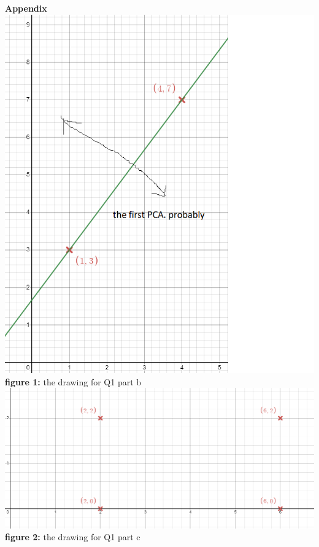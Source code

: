 \documentclass{article}
\theoremstyle{definition}
\theoremstyle{remark}
\begin{document}
       \begin{enumerate}[font={\Large\bfseries},left=0pt]
	            
    
    	             
	  
	            
       
                
	 
 
    \end{enumerate}
    
    \textbf{Appendix}
     \includegraphics[scale=0.5]{figs/pca1.png}\\
     \textbf{figure 1:} the drawing for Q1 part b\\
     
     \includegraphics[scale=0.5]{figs/pca2.png}\\
     \textbf{figure 2:} the drawing for Q1 part c
\end{document}
